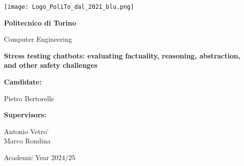 

\begin{titlepage}
    \begin{center}

        \texttt{[image: Logo\_PoliTo\_dal\_2021\_blu.png]}

        \vspace*{0.5cm}

        \LARGE
        \textbf{Politecnico di Torino}

        \vspace{0.5cm}
        \LARGE
        Computer Engineering

        \vspace*{1cm}
            
        \Huge
        \textbf{Stress testing chatbots: evaluating factuality, reasoning, abstraction, and other safety challenges}
            
                    
        \vspace{1.5cm}

        \Large
        \begin{minipage}[t]{0.4\textwidth}
             \textbf{Candidate:}
        \end{minipage}
        \hfill
        \begin{minipage}[t]{0.45\textwidth}
            \raggedleft
            Pietro Bertorelle
        \end{minipage}
            
            
        \vspace{1cm}
            
           
        \Large
        \begin{minipage}[t]{0.4\textwidth}
             \textbf{Supervisors:}
        \end{minipage}
        \hfill
        \begin{minipage}[t]{0.45\textwidth}
            \raggedleft
            Antonio Vetro'\\
            Marco Rondina\\
        \end{minipage}
        
        \vspace{2cm}
        Academic Year 2024/25
            
    \end{center}
\end{titlepage}



